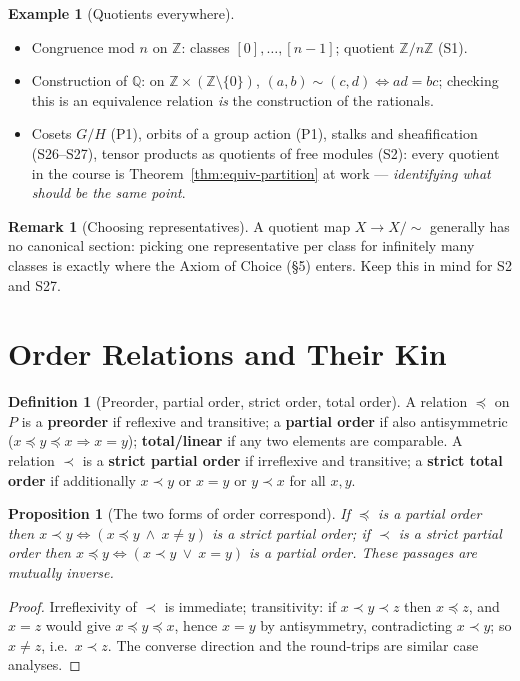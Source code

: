\documentclass[11pt,a4paper]{article}
\newtheorem{proposition}[theorem]{Proposition}
\theoremstyle{definition}
\newtheorem{definition}[theorem]{Definition}
\newtheorem{example}[theorem]{Example}
\newtheorem{remark}[theorem]{Remark}
\newcommand{\Z}{\mathbb{Z}}
\newcommand{\Q}{\mathbb{Q}}
\begin{document}
\begin{example}[Quotients everywhere]\label{ex:quotients}
\begin{itemize}
  \item Congruence mod $n$ on $\Z$: classes $[0],\dots,[n-1]$; quotient $\Z/n\Z$ (S1).
  \item Construction of $\Q$: on $\Z\times(\Z\setminus\{0\})$, $(a,b)\sim(c,d)\iff ad=bc$;
    checking this is an equivalence relation \emph{is} the construction of the rationals.
  \item Cosets $G/H$ (P1), orbits of a group action (P1), stalks and sheafification (S26--S27),
    tensor products as quotients of free modules (S2): every quotient in the course is
    Theorem~\ref{thm:equiv-partition} at work --- \emph{identifying what should be the same point}.
\end{itemize}
\end{example}

\begin{remark}[Choosing representatives]
A quotient map $X\to X/{\sim}$ generally has no canonical section: picking one representative per
class for infinitely many classes is exactly where the Axiom of Choice (\S5) enters. Keep this in
mind for S2 and S27.
\end{remark}

\section{Order Relations and Their Kin}

\begin{definition}[Preorder, partial order, strict order, total order]
A relation $\preceq$ on $P$ is a \textbf{preorder} if reflexive and transitive; a \textbf{partial
order} if also antisymmetric ($x\preceq y\preceq x\Rightarrow x=y$); \textbf{total/linear} if any two
elements are comparable. A relation $\prec$ is a \textbf{strict partial order} if irreflexive and
transitive; a \textbf{strict total order} if additionally $x\prec y$ or $x=y$ or $y\prec x$ for all $x,y$.
\end{definition}

\begin{proposition}[The two forms of order correspond]\label{prop:order-forms}
If $\preceq$ is a partial order then $x\prec y\iff(x\preceq y\ \wedge\ x\neq y)$ is a strict partial
order; if $\prec$ is a strict partial order then $x\preceq y\iff(x\prec y\ \vee\ x=y)$ is a partial
order. These passages are mutually inverse.
\end{proposition}
\begin{proof}
Irreflexivity of $\prec$ is immediate; transitivity: if $x\prec y\prec z$ then $x\preceq z$, and
$x=z$ would give $x\preceq y\preceq x$, hence $x=y$ by antisymmetry, contradicting $x\prec y$; so
$x\neq z$, i.e.\ $x\prec z$. The converse direction and the round-trips are similar case analyses.
\end{proof}
\end{document}
